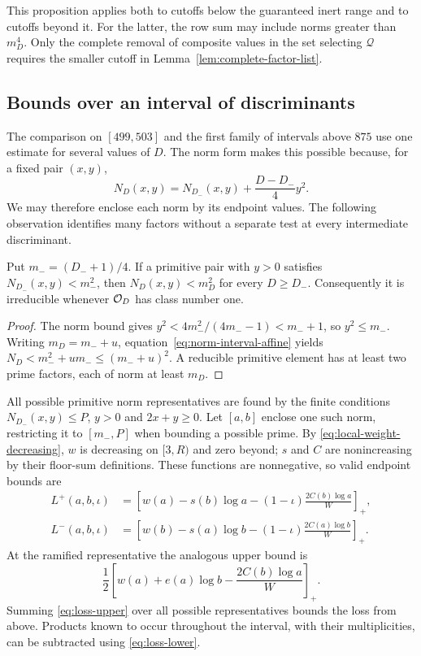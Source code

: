 This proposition applies both to cutoffs below the guaranteed inert
range and to cutoffs beyond it. For the latter, the row sum may include
norms greater than $m_D^4$. Only the complete removal of composite values
in the set selecting $\mathcal Q$ requires the smaller cutoff in
Lemma~\ref{lem:complete-factor-list}.

\subsection{Bounds over an interval of discriminants}\label{app:norm-intervals}
The comparison on $[499,503]$ and the first family of intervals above
$875$ use one estimate for several values of $D$. The norm form makes
this possible because, for a fixed pair $(x,y)$,
\begin{equation}\label{eq:norm-interval-affine}
 N_D(x,y)=N_{D_-}(x,y)+\frac{D-D_-}{4}y^2.
\end{equation}
We may therefore enclose each norm by its endpoint values. The following
observation identifies many factors without a separate test at every
intermediate discriminant.
\begin{lemma}\label{lem:interval-irreducibility}
Put $m_-=(D_-+1)/4$. If a primitive pair with $y>0$ satisfies
$N_{D_-}(x,y)<m_-^2$, then $N_D(x,y)<m_D^2$ for every $D\geq D_-$.
Consequently it is irreducible whenever $\mathcal O_D$ has class number one.
\end{lemma}
\begin{proof}
The norm bound gives $y^2<4m_-^2/(4m_--1)<m_-+1$, so $y^2\leq m_-$.
Writing $m_D=m_-+u$, equation~\eqref{eq:norm-interval-affine} yields
$N_D<m_-^2+um_-\leq(m_-+u)^2$. A reducible primitive element has
at least two prime factors, each of norm at least $m_D$.
\end{proof}

All possible primitive norm representatives are found by the finite
conditions $N_{D_-}(x,y)\leq P$, $y>0$ and $2x+y\geq0$.
Let $[a,b]$ enclose one such norm, restricting it to $[m_-,P]$ when
bounding a possible prime. By \eqref{eq:local-weight-decreasing}, $w$
is decreasing on $[3,R)$ and zero beyond; $s$ and $C$ are nonincreasing
by their floor-sum definitions. These functions are nonnegative, so
valid endpoint bounds are
\begin{align}
 L^+(a,b,\iota)&=
 \left[w(a)-s(b)\log a-(1-\iota)\frac{2C(b)\log a}{W}\right]_+,
 \label{eq:loss-upper}\\
 L^-(a,b,\iota)&=
 \left[w(b)-s(a)\log b-(1-\iota)\frac{2C(a)\log b}{W}\right]_+.
 \label{eq:loss-lower}
\end{align}
At the ramified representative the analogous upper bound is
\[
 \frac12\left[w(a)+e(a)\log b-\frac{2C(b)\log a}{W}\right]_+.
\]
Summing \eqref{eq:loss-upper} over all possible representatives bounds
the loss from above. Products known to occur throughout the interval,
with their multiplicities, can be subtracted using \eqref{eq:loss-lower}.

